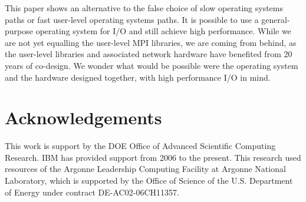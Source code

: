 \documentclass[letterpaper,twocolumn,10pt]{article}
\begin{document}
This paper shows an alternative to the false choice of slow operating systems paths or fast user-level operating systems paths. It is possible to use a general-purpose operating system for I/O and still achieve high performance. While we are not yet equalling the user-level MPI libraries, we are coming from behind, as the user-level libraries and associated network hardware have benefited from 20 years of co-design. 
We wonder what would be possible were the operating system and the hardware designed together, with high performance I/O in mind. 

\section{Acknowledgements}
This work is support by the DOE Office of Advanced Scientific Computing Research. IBM has provided support from 2006 to the present. This research used resources of the Argonne Leadership Computing Facility
 at Argonne National Laboratory, which is supported by the Office of Science
 of the U.S.
 Department of Energy under contract DE-AC02-06CH11357.

 

\end{document}
